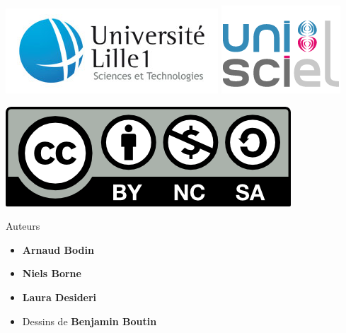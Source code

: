 








\begin{frame}

\thispagestyle{empty}    

  \hspace*{-20ex}
  \begin{minipage}{0.6\textwidth}
  \begin{center}
    \vspace*{5ex}   


    \bigskip

    \includegraphics[scale=0.3]{../divers/logotypeLille1-QUADRI-ECRAN.jpg}
    \quad
    \includegraphics[scale=0.3]{../divers/logo-unisciel.png}

    \vspace*{5ex}

    \includegraphics[scale=0.5]{../divers/by-nc-sa.png}
  \end{center}
  \end{minipage}
  \hfil
  \begin{minipage}{0.65\textwidth}
  \vspace*{5ex}
  Auteurs
  \begin{itemize}
    \item {\bf Arnaud Bodin}
    \item {\bf Niels Borne}
    \item {\bf Laura Desideri}
    \item Dessins de {\bf \small Benjamin Boutin}  
  \end{itemize}


\end{minipage}
\end{frame}
